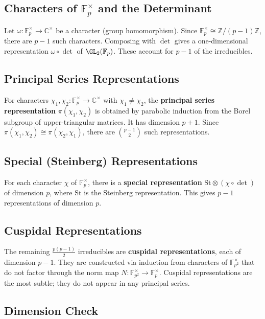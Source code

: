 \subsection{Characters of $\mathbb{F}_p^\times$ and the Determinant}

Let $\omega : \mathbb{F}_p^\times \to \mathbb{C}^\times$ be a character (group
homomorphism).
Since $\mathbb{F}_p^\times \cong \mathbb{Z}/(p-1)\mathbb{Z}$, there are $p - 1$
such characters.
Composing with $\det$ gives a one-dimensional representation $\omega \circ \det$
of $\GL_2(\mathbb{F}_p)$.
These account for $p - 1$ of the irreducibles.

\subsection{Principal Series Representations}

For characters $\chi_1, \chi_2 : \mathbb{F}_p^\times \to \mathbb{C}^\times$ with
$\chi_1 \neq \chi_2$, the \textbf{principal series representation}
$\pi(\chi_1, \chi_2)$ is obtained by parabolic induction from the Borel
subgroup of upper-triangular matrices.
It has dimension $p + 1$.
Since $\pi(\chi_1, \chi_2) \cong \pi(\chi_2, \chi_1)$, there are
$\binom{p-1}{2}$ such representations.

\subsection{Special (Steinberg) Representations}

For each character $\chi$ of $\mathbb{F}_p^\times$, there is a
\textbf{special representation} $\mathrm{St} \otimes (\chi \circ \det)$ of
dimension $p$, where $\mathrm{St}$ is the Steinberg representation.
This gives $p - 1$ representations of dimension $p$.

\subsection{Cuspidal Representations}

The remaining $\frac{p(p-1)}{2}$ irreducibles are \textbf{cuspidal representations},
each of dimension $p - 1$.
They are constructed via induction from characters of $\mathbb{F}_{p^2}^\times$
that do not factor through the norm map $N : \mathbb{F}_{p^2}^\times \to \mathbb{F}_p^\times$.
Cuspidal representations are the most subtle; they do not appear in any
principal series.

\subsection{Dimension Check}

